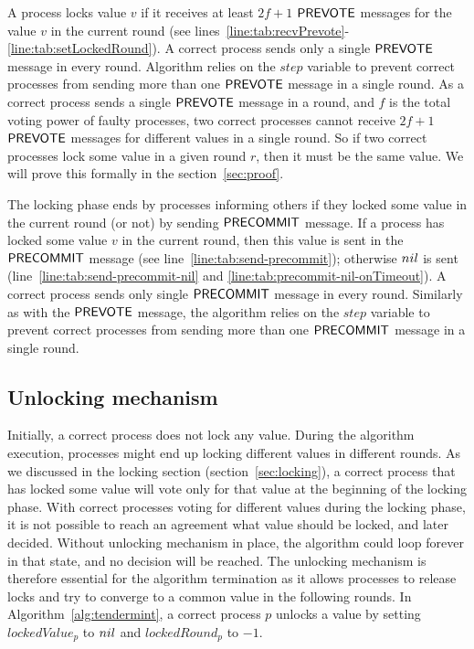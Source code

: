 A process locks value $v$ if it receives at least $2f+1$ $\mathsf{PREVOTE}$ messages for the value $v$ in the current round (see lines~\ref{line:tab:recvPrevote}-\ref{line:tab:setLockedRound}). A correct process sends only a single $\mathsf{PREVOTE}$ message in every round. Algorithm relies on the $step$ variable to prevent correct processes from sending more than one $\mathsf{PREVOTE}$ message in a single round. As a correct process sends a single $\mathsf{PREVOTE}$ message in a round, and $f$ is the total voting power of faulty processes, two correct processes cannot receive $2f+1$ $\mathsf{PREVOTE}$ messages for different values in a single round. So if two correct processes lock some value in a given round $r$, then it must be the same value. We will prove this formally in the section~\ref{sec:proof}.    

The locking phase ends by processes informing others if they locked some value in the current round (or not) by sending $\mathsf{PRECOMMIT}$ message. If a process has locked some value $v$ in the current round, then this value is sent in the $\mathsf{PRECOMMIT}$ message (see line~\ref{line:tab:send-precommit}); otherwise $nil$ is sent (line~\ref{line:tab:send-precommit-nil} and \ref{line:tab:precommit-nil-onTimeout}). A correct process sends only single $\mathsf{PRECOMMIT}$ message in every round. Similarly as with the $\mathsf{PREVOTE}$ message, the algorithm relies on the $step$ variable to prevent correct processes from sending more than one $\mathsf{PRECOMMIT}$ message in a single round. 

\subsection{Unlocking mechanism}
\label{sec:unlocking}

Initially, a correct process does not lock any value. During the algorithm execution, processes might end up locking different values in different rounds. As we discussed in the locking section (section~\ref{sec:locking}), a correct process that has locked some value will vote
only for that value at the beginning of the locking phase. With correct processes voting for different values during the locking phase, it is not possible to reach an agreement what value should be locked, and later decided. Without unlocking mechanism in place, the algorithm could loop forever in that state, and no decision will be reached. The unlocking mechanism is therefore essential for the algorithm termination as it allows processes to release locks and try to converge to a common value in the following rounds. In Algorithm~\ref{alg:tendermint}, a correct process $p$ unlocks a value by setting $lockedValue_p$ to $nil$ and $lockedRound_p$ to $-1$. 

